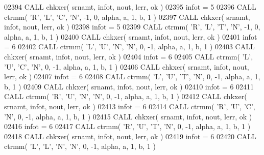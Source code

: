 \begin{DoxyCode}
02394       \textcolor{keyword}{CALL }chkxer( srnamt, infot, nout, lerr, ok )
02395       infot = 5
02396       \textcolor{keyword}{CALL }ctrmm( \textcolor{stringliteral}{'R'}, \textcolor{stringliteral}{'L'}, \textcolor{stringliteral}{'C'}, \textcolor{stringliteral}{'N'}, -1, 0, alpha, a, 1, b, 1 )
02397       \textcolor{keyword}{CALL }chkxer( srnamt, infot, nout, lerr, ok )
02398       infot = 5
02399       \textcolor{keyword}{CALL }ctrmm( \textcolor{stringliteral}{'R'}, \textcolor{stringliteral}{'L'}, \textcolor{stringliteral}{'T'}, \textcolor{stringliteral}{'N'}, -1, 0, alpha, a, 1, b, 1 )
02400       \textcolor{keyword}{CALL }chkxer( srnamt, infot, nout, lerr, ok )
02401       infot = 6
02402       \textcolor{keyword}{CALL }ctrmm( \textcolor{stringliteral}{'L'}, \textcolor{stringliteral}{'U'}, \textcolor{stringliteral}{'N'}, \textcolor{stringliteral}{'N'}, 0, -1, alpha, a, 1, b, 1 )
02403       \textcolor{keyword}{CALL }chkxer( srnamt, infot, nout, lerr, ok )
02404       infot = 6
02405       \textcolor{keyword}{CALL }ctrmm( \textcolor{stringliteral}{'L'}, \textcolor{stringliteral}{'U'}, \textcolor{stringliteral}{'C'}, \textcolor{stringliteral}{'N'}, 0, -1, alpha, a, 1, b, 1 )
02406       \textcolor{keyword}{CALL }chkxer( srnamt, infot, nout, lerr, ok )
02407       infot = 6
02408       \textcolor{keyword}{CALL }ctrmm( \textcolor{stringliteral}{'L'}, \textcolor{stringliteral}{'U'}, \textcolor{stringliteral}{'T'}, \textcolor{stringliteral}{'N'}, 0, -1, alpha, a, 1, b, 1 )
02409       \textcolor{keyword}{CALL }chkxer( srnamt, infot, nout, lerr, ok )
02410       infot = 6
02411       \textcolor{keyword}{CALL }ctrmm( \textcolor{stringliteral}{'R'}, \textcolor{stringliteral}{'U'}, \textcolor{stringliteral}{'N'}, \textcolor{stringliteral}{'N'}, 0, -1, alpha, a, 1, b, 1 )
02412       \textcolor{keyword}{CALL }chkxer( srnamt, infot, nout, lerr, ok )
02413       infot = 6
02414       \textcolor{keyword}{CALL }ctrmm( \textcolor{stringliteral}{'R'}, \textcolor{stringliteral}{'U'}, \textcolor{stringliteral}{'C'}, \textcolor{stringliteral}{'N'}, 0, -1, alpha, a, 1, b, 1 )
02415       \textcolor{keyword}{CALL }chkxer( srnamt, infot, nout, lerr, ok )
02416       infot = 6
02417       \textcolor{keyword}{CALL }ctrmm( \textcolor{stringliteral}{'R'}, \textcolor{stringliteral}{'U'}, \textcolor{stringliteral}{'T'}, \textcolor{stringliteral}{'N'}, 0, -1, alpha, a, 1, b, 1 )
02418       \textcolor{keyword}{CALL }chkxer( srnamt, infot, nout, lerr, ok )
02419       infot = 6
02420       \textcolor{keyword}{CALL }ctrmm( \textcolor{stringliteral}{'L'}, \textcolor{stringliteral}{'L'}, \textcolor{stringliteral}{'N'}, \textcolor{stringliteral}{'N'}, 0, -1, alpha, a, 1, b, 1 )

\end{DoxyCode}
